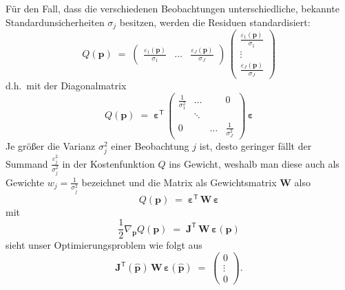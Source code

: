 Für den Fall, dass die verschiedenen Beobachtungen unterschiedliche, bekannte
Standardunsicherheiten $\sigma_j$ besitzen, werden die Residuen standardisiert:
\begin{equation}
Q(\mathbf{p}) \; = \;
  \left(\begin{array}{ccc}
  \frac{\varepsilon_1(\mathbf{p})}{\sigma_1} & \dots &
 \frac{\varepsilon_J(\mathbf{p})}{\sigma_J} \end{array} \right)
\, \left(\begin{array}{c} \frac{\varepsilon_1(\mathbf{p})}{\sigma_1}\\
 \vdots\\ \frac{\varepsilon_J(\mathbf{p})}{\sigma_J}\end{array} \right)
\label{ZielfunktionalJmitW}
\end{equation}
d.h.\ mit der Diagonalmatrix
\begin{equation}
Q(\mathbf{p}) \; = \;
  \boldsymbol{\varepsilon}^\textsf{T}
\, \left(\begin{array}{cccc} \frac{1}{\sigma_1^2} & \dots & & 0 \\
  & \ddots & \\
 0 & & \dots &  \frac{1}{\sigma_J^2} \end{array} \right) \, \boldsymbol{\varepsilon}
\label{ZielfunktionalJmitW1}
\end{equation}
Je größer die Varianz $\sigma_j^2$ einer Beobachtung $j$ ist,
desto geringer fällt der Summand $\frac{\varepsilon_j^2}{\sigma_j^2}$ in der Kostenfunktion $Q$
ins Gewicht, weshalb man diese auch als Gewichte $w_j = \frac{1}{\sigma_j^2}$ bezeichnet
und die Matrix als Gewichtsmatrix $\mathbf{W}$ also
\begin{equation}
Q(\mathbf{p}) \; = \;
  \boldsymbol{\varepsilon}^\textsf{T}
\, \mathbf{W} \, \boldsymbol{\varepsilon}
\label{ZielfunktionalJmitW2}
\end{equation}
mit
\begin{equation}
\frac{1}{2} \nabla_{\mathbf{p}} Q(\mathbf{p})  \; = \;
 \boldsymbol{J}^\mathsf{T} \, \mathbf{W} \,
 \boldsymbol{\varepsilon}(\mathbf{p})
\label{ZielfunktionalGradJW}
\end{equation}
sieht unser Optimierungsproblem wie folgt aus
\begin{equation}
\boldsymbol{J}^\mathsf{T}(\mathbf{\hat p})\,
\mathbf{W}\,\boldsymbol{\varepsilon}(\mathbf{\hat p})
\; = \; \left(\begin{array}{c} 0 \\ \vdots \\ 0 \end{array}\right) .
\label{ZielfunktionalGrad1W}
\end{equation}
